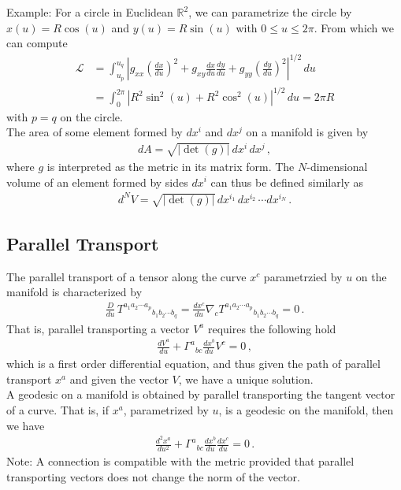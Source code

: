 \documentclass[11pt, onesided]{book}
\theoremstyle{break}
\theoremstyle{break}
\newcommand{\R}{\mathbb{R}}
\newcommand{\note}{\color{red}Note: \color{black}}
\newcommand{\example}{\color{green}Example: \color{black}}
\begin{document}
\example For a circle in Euclidean $\R^2$, we can parametrize the circle by $x(u) = R\cos(u)$ and $y(u) = R\sin(u)$ with $0\leq u \leq 2\pi$. From which we can compute
\begin{align*}
\mathcal{L} 
&= \int_{u_p}^{u_q} \left| g_{xx}\left( \frac{dx}{du}\right)^2 + g_{xy} \frac{dx}{du}\frac{dy}{du}+ g_{yy}\left( \frac{dy}{du}\right)^2 \right|^{1/2} \, du \\
&= \int_{0}^{2\pi} \left| R^2 \sin^2(u) + R^2 \cos^2(u)\right|^{1/2} \, du = 2\pi R
\end{align*}
with $p = q$ on the circle. \\

The area of some element formed by $dx^i$ and $dx^j$ on a manifold is given by
\begin{align*}
dA = \sqrt{|\det(g)|}\, dx^i \, dx^j\,,
\end{align*}
where $g$ is interpreted as the metric in its matrix form. The $N$-dimensional volume of an element formed by sides $dx^i$ can thus be defined similarly as 
\begin{align*}
d^NV = \sqrt{|\det(g)|}\, dx^{i_1} \, dx^{i_2} \, \cdots dx^{i_N}\,.
\end{align*}

\subsection{Parallel Transport}
The parallel transport of a tensor along the curve $x^c$ parametrzied by $u$ on the manifold is characterized by
\begin{align*}
\frac{D}{du}\, T^{a_1a_2\cdots a_p}{}_{b_1b_2\cdots b_q}  = \frac{dx^c}{du}\nabla_c T^{a_1a_2\cdots a_p}{}_{b_1b_2\cdots b_q}  = 0\,.
\end{align*}
That is, parallel transporting a vector $V^a$ requires the following hold
\begin{align}
\frac{dV^a}{du} + \Gamma^{a}{}_{bc} \frac{dx^b}{du}V^c = 0\,,
\end{align}
which is a first order differential equation, and thus given the path of parallel transport $x^a$ and given the vector $V$, we have a unique solution.\\

A geodesic on a manifold is obtained by parallel transporting the tangent vector of a curve. That is, if $x^a$, parametrized by $u$, is a geodesic on the manifold, then we have
\begin{align*}
\frac{d^2x^a}{du^2} + \Gamma^{a}{}_{bc} \frac{dx^b}{du}\frac{dx^c}{du}  = 0\,.
\end{align*}
\note A connection is compatible with the metric provided that parallel transporting vectors does not change the norm of the vector. \\
\end{document}
